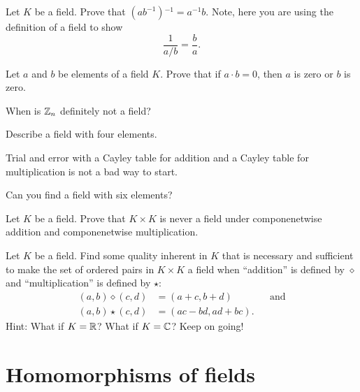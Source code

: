 \documentclass{ximera}
\begin{document}
\begin{exercise}
  Let $K$ be a field. Prove that ${\left(ab^{-1}\right)}\hspace{0pt}^{-1} = a^{-1}
  b$. Note, here you are using the definition of a field to show
  \[
  \frac{1}{a/b} = \frac{b}{a}.
  \]
\end{exercise}


\begin{exercise} 
  Let $a$ and $b$ be elements of a field $K$. Prove that if $a\cdot b
  = 0$, then $a$ is zero or $b$ is zero. 
\end{exercise}




\begin{exercise} 
  When is $\mathbb Z_n$ definitely not a field?
\end{exercise}

\begin{exercise}\label{E:FF4}
  Describe a field with four elements.
  \begin{hint}
    Trial and error with a Cayley table for addition and a Cayley
    table for multiplication is not a bad way to start.
  \end{hint}
\end{exercise}


\begin{exercise}\label{E:FF6} Can you find a field with six elements?
\end{exercise}


\begin{exercise}
  Let $K$ be a field. Prove that $K\times K$ is never a field under
  componenetwise addition and componenetwise multiplication.
\end{exercise}


\begin{exercise} 
  Let $K$ be a field. Find some quality inherent in $K$ that is
  necessary and sufficient to make the set of ordered pairs in $K\times
  K$ a field when ``addition'' is defined by $\diamond$ and
  ``multiplication'' is defined by $\star$:
  \begin{align*}
    (a,b)\diamond (c,d) &= (a+c, b+d) & &\text{and}\\
    (a,b)\star (c,d) &= (ac-bd,ad+bc).
  \end{align*}
  Hint: What if $K = \mathbb R$? What if $K = \mathbb C$? Keep on going!
\end{exercise}



\section{Homomorphisms of fields}
\end{document}
